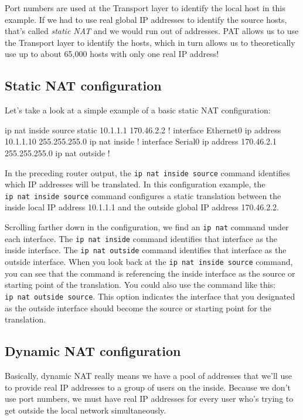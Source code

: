 Port numbers are used at the Transport layer to identify the local host
in this example. If we had to use real global IP addresses to identify
the source hosts, that's called \emph{static NAT}
and we would run out
of addresses. PAT allows us to use the Transport layer to identify the
hosts, which in turn allows us to theoretically use up to about 65,000
hosts with only one real IP address!



\subsection{Static NAT configuration}

Let's take a look at a simple example of a basic static NAT
configuration:

\begin{cli}
ip nat inside source static 10.1.1.1 170.46.2.2
!
interface Ethernet0
 ip address 10.1.1.10 255.255.255.0
 ip nat inside
!
interface Serial0
 ip address 170.46.2.1 255.255.255.0
 ip nat outside
!
\end{cli}

In the preceding router output, the \texttt{ip\ nat\ inside\ source}
command identifies which IP addresses will be translated. In this
configuration example, the \texttt{ip\ nat\ inside\ source} command
configures a static translation between the inside local IP address
10.1.1.1 and the outside global IP address 170.46.2.2.

Scrolling farther down in the configuration, we find an \texttt{ip\ nat}
command under each interface. The \texttt{ip\ nat\ inside} command
identifies that interface as the inside interface. The
\texttt{ip\ nat\ outside} command identifies that interface as the
outside interface. When you look back at the
\texttt{ip\ nat\ inside\ source} command, you can see that the command
is referencing the inside interface as the source or starting point of
the translation. You could also use the command like this:
\texttt{ip\ nat\ outside\ source}. This option indicates the interface
that you designated as the outside interface should become the source or
starting point for the translation.





\subsection{Dynamic NAT configuration}

Basically, dynamic NAT really means we have a pool of addresses that
we'll use to provide real IP addresses to a group of users on the
inside. Because we don't use port numbers, we must have real IP
addresses for every user who's trying to get outside the local network
simultaneously.

